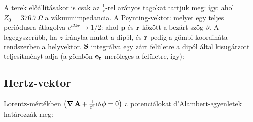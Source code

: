    A terek előállításakor is csak az $\frac{1}{r}$-rel arányos tagokat tartjuk meg:
   így:
   ahol $Z_0=376.7\,\Omega$ a vákuumimpedancia. A Poynting-vektor:
   melyet egy teljes periódusra átlagolva $e^{i2kr}\to 1/2$:
   ahol $\mathbf{p}$ és $\mathbf{r}$ között a bezárt szög $\vartheta$. A legegyszerűbb, ha $z$ irányba mutat a dipól, és $\mathbf{r}$ pedig a gömbi koordináta-rendszerben a helyvektor. $\mathbf{S}$ integrálva egy zárt felületre a dipól által kisugárzott teljesítményt adja (a gömbön $\mathbf{e}_{\mathbf{r}}$ merőleges a felületre, így):
   
  \subsection{Hertz-vektor}
   
   Lorentz-mértékben $\left(\mathop{\boldsymbol{\nabla}}\nolimits \mathbf{A}+\frac{1}{c^2}\partial_t\phi=0\right)$ a potenciálokat d'Alambert-egyen\-letek határozzák meg:
   

